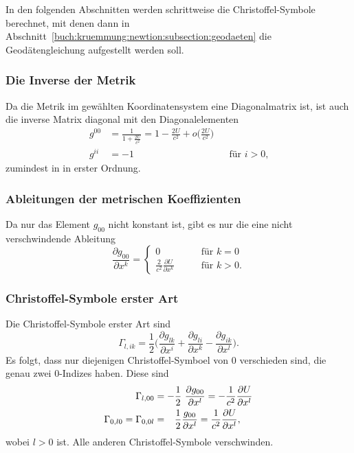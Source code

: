 In den folgenden Abschnitten werden schrittweise die Christoffel-Symbole
berechnet, mit denen dann in
Abschnitt~\ref{buch:kruemmung:newtion:subsection:geodaeten}
die Geodätengleichung aufgestellt werden soll.

%
%
\subsubsection{Die Inverse der Metrik}
Da die Metrik im gewählten Koordinatensystem eine Diagonalmatrix ist,
ist auch die inverse Matrix diagonal mit den Diagonalelementen
\begin{equation}
\begin{aligned}
g^{00}
&=
\frac{1}{\displaystyle 1+\frac{2U}{c^2}}
=
1-\frac{2U}{c^2}+o\biggl(\frac{2U}{c^2}\biggr)
\\
g^{ii}&= -1
&&\text{für $i>0$,}
\end{aligned}
\end{equation}
zumindest in in erster Ordnung.

%
%
\subsubsection{Ableitungen der metrischen Koeffizienten}
Da nur das Element $g_{00}$ nicht konstant ist, gibt es nur die eine
nicht verschwindende Ableitung
\[
\frac{\partial g_{00}}{\partial x^k}
=
\begin{cases}
0
&\qquad\text{für $k=0$}\\[4pt]
\displaystyle
\frac{2}{c^2}
\frac{\partial U}{\partial x^k}
&\qquad\text{für $k>0$.}
\end{cases}
\]

%
%
\subsubsection{Christoffel-Symbole erster Art}
Die Christoffel-Symbole erster Art sind
\[
\Gamma_{l,ik}
=
\frac{1}{2}\biggl(
\frac{\partial g_{lk}}{\partial x^i}
+
\frac{\partial g_{li}}{\partial x^k}
-
\frac{\partial g_{ik}}{\partial x^l}
\biggr).
\]
Es folgt, dass nur diejenigen Christoffel-Symboel von $0$ verschieden
sind, die genau zwei $0$-Indizes haben.
Diese sind
\begin{align}
\Gamma_{l,00}
&=
-\frac12 \frac{\partial g_{00}}{\partial x^l}
=
-
\frac{1}{c^2}\frac{\partial U}{\partial x^l}
\notag
\\
\Gamma_{0,l0}
=
\Gamma_{0,0l}
&=
\phantom{-}
\frac{1}{2}\frac{g_{00}}{\partial x^l}
=
\frac{1}{c^2}\frac{\partial U}{\partial x^l},
\label{buch:kruemmung:newton:eqn:bewegungsgleichung}
\end{align}
wobei $l>0$ ist.
Alle anderen Christoffel-Symbole verschwinden.

